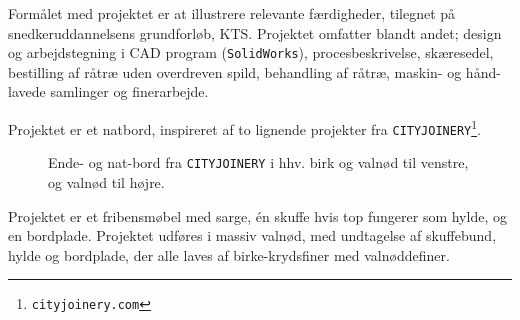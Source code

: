Formålet med projektet er at illustrere relevante færdigheder, tilegnet på
snedkeruddannelsens grundforløb, KTS.
Projektet omfatter blandt andet; design og arbejdstegning i CAD program
(\texttt{SolidWorks}), procesbeskrivelse, skæresedel, bestilling af råtræ uden
overdreven spild, behandling af råtræ, maskin- og hånd-lavede samlinger og finerarbejde.

Projektet er et natbord, inspireret af to lignende projekter fra
\texttt{CITYJOINERY}\nolinebreak \footnote{\texttt{cityjoinery.com}}.

\begin{figure}[htb]
\centering
{}
\caption{Ende- og nat-bord fra \texttt{CITYJOINERY} i hhv. birk og valnød til
venstre, og valnød til højre.} \end{figure}

Projektet er et fribensmøbel med sarge, én skuffe hvis top fungerer som hylde,
og en bordplade. Projektet udføres i massiv valnød, med undtagelse af
skuffebund, hylde og bordplade, der alle laves af birke-krydsfiner med
valnøddefiner.

